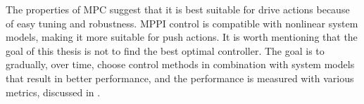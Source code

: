 The properties of \ac{MPC} suggest that it is best suitable for drive actions because of easy tuning and robustness. \Ac{MPPI} control is compatible with nonlinear system models, making it more suitable for push actions. It is worth mentioning that the goal of this thesis is not to find the best optimal controller. The goal is to gradually, over time, choose control methods in combination with system models that result in better performance, and the performance is measured with various metrics, discussed in .\bs
